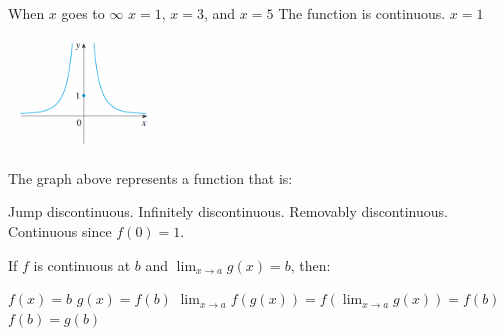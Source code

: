 \documentclass[addpoints, 12pt]{exam}%
\newcommand{\spc}{\vspace*{0.5cm}}
\begin{document}
\begin{questions}
\begin{choices}
\choice When $x$ goes to $\infty$
\CorrectChoice $x = 1$, $x = 3$, and $x = 5$
\choice The function is continuous.
\choice $x = 1$
\end{choices}

\question[1]
\includegraphics[width=0.3\textwidth]{Infinite discontinuity.png}

The graph above represents a function that is:

\begin{choices}
\choice Jump discontinuous.
\CorrectChoice Infinitely discontinuous.
\choice Removably discontinuous.
\choice Continuous since $f(0) = 1$.
\end{choices}

\spc

\question[1]

If $f$ is continuous at $b$ and $\lim_{x \to a} g(x) = b$, then:

\begin{choices}
\choice $f(x) = b$
\choice $g(x) = f(b)$
\CorrectChoice $\lim_{x \to a} f(g(x)) = f(\lim_{x \to a} g(x)) = f(b)$
\choice $f(b) = g(b)$
\end{choices}

\end{questions}
\end{document}
